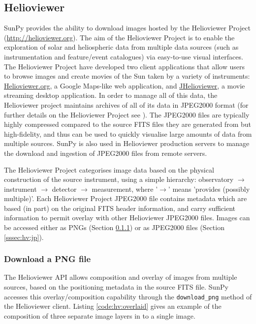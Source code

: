 \subsection{Helioviewer}\label{ssec:hv}

SunPy provides the ability to download images hosted by the
Helioviewer Project (\href{http://helioviewer.org}{http://helioviewer.org}).  
The aim of the Helioviewer Project is to enable
the exploration of solar and heliospheric data from multiple data
sources (such as instrumentation and feature/event catalogues) via
easy-to-use visual interfaces. The Helioviewer Project have developed two client 
applications that allow users to browse images and create movies of the Sun taken 
by a variety of instruments: \href{http://www.helioviewer.org}{Helioviewer.org}, a 
Google Maps-like web application, and \href{http://www.jhelioviewer.org}{JHelioviewer}, 
a movie streaming desktop application. In order to manage all of this data, the Helioviewer
project maintains archives of all of its data in JPEG2000 format (for further
details on the Helioviewer Project see \cite{muller2009}). The
JPEG2000 files are typically highly compressed compared to the source
FITS files they are generated from but high-fidelity, and thus can be used to quickly
visualise large amounts of data from multiple sources.  SunPy is
also used in Helioviewer production servers to manage the download and
ingestion of JPEG2000 files from remote servers.

The Helioviewer Project categorises image data based on the physical
construction of the source instrument, using a simple hierarchy:
observatory $\rightarrow$ instrument $\rightarrow$ detector
$\rightarrow$ measurement, where '$\rightarrow$' means 'provides
(possibly multiple)'.  
Each Helioviewer Project JPEG2000 file contains
metadata which are based (in part) on the original FITS header
information, and carry sufficient information to permit overlay with
other Helioviewer JPEG2000 files. Images can be accessed either as
PNGs (Section \ref{sssec:hv:png}) or as JPEG2000 files (Section
\ref{sssec:hv:jp}).

\subsubsection{Download a PNG file}\label{sssec:hv:png}

The Helioviewer API allows composition and overlay of images from
multiple sources, based on the positioning metadata in the source FITS
file.  SunPy accesses this overlay/composition capability through the
\texttt{download\_png} method of the Helioviewer client.  Listing
\ref{code:hv:overlaid} gives an example of the composition of three
separate image layers in to a single image.

